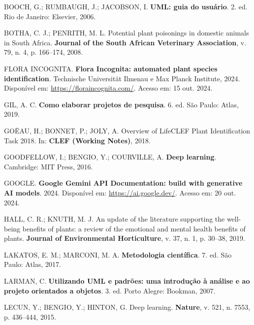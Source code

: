\documentclass[12pt,a4paper]{article}
\begin{document}
\noindent BOOCH, G.; RUMBAUGH, J.; JACOBSON, I. \textbf{UML: guia do usuário}. 2. ed. Rio de Janeiro: Elsevier, 2006.

\vspace{0.2cm}
\noindent BOTHA, C. J.; PENRITH, M. L. Potential plant poisonings in domestic animals in South Africa. \textbf{Journal of the South African Veterinary Association}, v. 79, n. 4, p. 166--174, 2008.

\vspace{0.2cm}
\noindent FLORA INCOGNITA. \textbf{Flora Incognita: automated plant species identification}. Technische Universität Ilmenau e Max Planck Institute, 2024. Disponível em: \url{https://floraincognita.com/}. Acesso em: 15 out. 2024.

\vspace{0.2cm}
\noindent GIL, A. C. \textbf{Como elaborar projetos de pesquisa}. 6. ed. São Paulo: Atlas, 2019.

\vspace{0.2cm}
\noindent GOËAU, H.; BONNET, P.; JOLY, A. Overview of LifeCLEF Plant Identification Task 2018. In: \textbf{CLEF (Working Notes)}, 2018.

\vspace{0.2cm}
\noindent GOODFELLOW, I.; BENGIO, Y.; COURVILLE, A. \textbf{Deep learning}. Cambridge: MIT Press, 2016.

\vspace{0.2cm}
\noindent GOOGLE. \textbf{Google Gemini API Documentation: build with generative AI models}. 2024. Disponível em: \url{https://ai.google.dev/}. Acesso em: 20 out. 2024.

\vspace{0.2cm}
\noindent HALL, C. R.; KNUTH, M. J. An update of the literature supporting the well-being benefits of plants: a review of the emotional and mental health benefits of plants. \textbf{Journal of Environmental Horticulture}, v. 37, n. 1, p. 30--38, 2019.

\vspace{0.2cm}
\noindent LAKATOS, E. M.; MARCONI, M. A. \textbf{Metodologia científica}. 7. ed. São Paulo: Atlas, 2017.

\vspace{0.2cm}
\noindent LARMAN, C. \textbf{Utilizando UML e padrões: uma introdução à análise e ao projeto orientados a objetos}. 3. ed. Porto Alegre: Bookman, 2007.

\vspace{0.2cm}
\noindent LECUN, Y.; BENGIO, Y.; HINTON, G. Deep learning. \textbf{Nature}, v. 521, n. 7553, p. 436--444, 2015.
\end{document}

